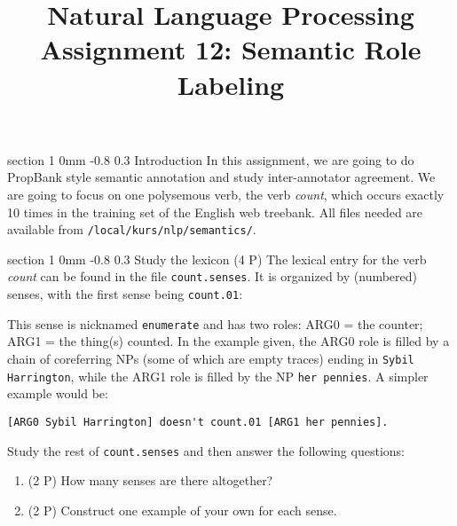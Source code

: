 \documentclass[11pt]{article}
\title{{\LARGE Natural Language Processing}\\[1.5mm]{\large Assignment 12: Semantic Role Labeling}}
\author{}
\date{} %
\makeatletter
\newcommand{\newsec}[2]{\section{#1}\label{sec:#2}\noindent}
\renewcommand{\section}{\@startsection
{section}%
{1}%
{0mm}%
{-0.8\baselineskip}%
{0.3\baselineskip}%
{\bfseries\large}}%
\makeatother
\begin{document}
 

\maketitle
\vspace{-2mm} \newsec{Introduction}{intro}%
In this assignment, we are going to do PropBank style semantic
annotation and study inter-annotator agreement. We are going to focus
on one polysemous verb, the verb {\em count}, which occurs exactly 10
times in the training set of the English web treebank. All files
needed are available from {\tt /local/kurs/nlp/semantics/}.


\newsec{Study the lexicon (4 P)}{lex}%
The lexical entry for the verb {\em count} can be found in the file
{\tt count.senses}. It is organized by (numbered) senses, with the
first sense being {\tt count.01}:

 This sense is nicknamed {\tt enumerate} and has
two roles: ARG0 = the counter; ARG1 = the thing(s) counted.  In the
example given, the ARG0 role is filled by a chain of coreferring NPs
(some of which are empty traces) ending in {\tt Sybil Harrington},
while the ARG1 role is filled by the NP {\tt her pennies}. A simpler
example would be:
\begin{Verbatim}[fontsize=\small,xleftmargin=\parindent]
[ARG0 Sybil Harrington] doesn't count.01 [ARG1 her pennies].
\end{Verbatim}
Study the rest of {\tt count.senses} and then answer the following
questions:
\begin{enumerate}[noitemsep,topsep=0.2cm]
\item (2 P) How many senses are there altogether?
\item (2 P) Construct one example of your own for each sense.
\end{enumerate}
\end{document}
